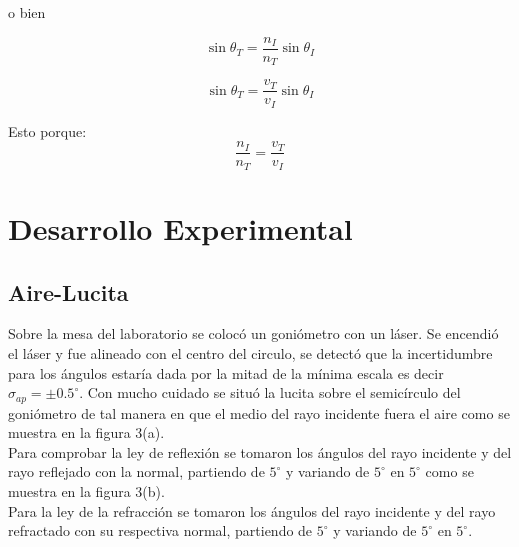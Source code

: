 \documentclass[DIV=calc, paper=a4, fontsize=11pt]{scrartcl}
\begin{document}
o bien

\begin{equation}
    \sin{\theta_T} =  \frac{n_I}{n_T} \sin{\theta_I} 
\end{equation}

\begin{equation}
    \sin{\theta_T} = \frac{v_T}{v_I} \sin{\theta_I}
\end{equation}

Esto porque:
\begin{equation}
    \frac{n_I}{n_T} = \frac{v_T}{v_I}
\end{equation}


\section*{\textcolor{carmine}{Desarrollo Experimental}}
\subsection*{\textcolor{carmine}{Aire-Lucita}}
Sobre la mesa del laboratorio se colocó un goniómetro con un láser. Se encendió el láser y fue alineado con el centro del circulo, se detectó que la incertidumbre para los ángulos estaría dada por la mitad de la mínima escala es decir $\sigma_{ap}=\pm 0.5^{\circ}$. Con mucho cuidado se situó la lucita sobre el semicírculo del goniómetro de tal manera en que el medio del rayo incidente fuera el aire como se muestra en la figura 3(a).
\\
Para comprobar la ley de reflexión se tomaron los ángulos del rayo incidente y del rayo reflejado con la normal,  partiendo de $5^{\circ}$ y variando de $5^{\circ}$ en $5^{\circ}$ como se muestra en la figura 3(b).
\\
Para la ley de la refracción se tomaron los ángulos del rayo incidente y del rayo refractado con su respectiva normal, partiendo de $5^{\circ}$ y variando de $5^{\circ}$ en $5^{\circ}$.
\end{document}
